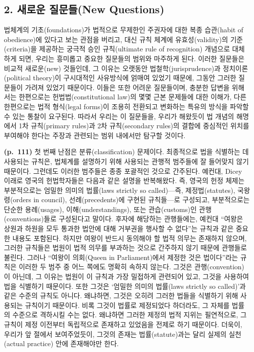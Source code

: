 \subsection{2. 새로운 질문들(New
Questions)}\label{uxc0c8uxb85cuxc6b4-uxc9c8uxbb38uxb4e4new-questions}

법체계의 기초(foundations)가 법적으로 무제한인 주권자에 대한 복종
습관(habit of obedience)에 있다고 보는 관점을 버리고, 대신 규칙 체계에
유효성(validity)의 기준(criteria)을 제공하는 궁극적 승인 규칙(ultimate
rule of recognition) 개념으로 대체하게 되면, 우리는 흥미롭고 중요한
질문들의 범위와 마주하게 된다. 이러한 질문들은 비교적 새로운(new)
것들인데, 그 이유는 오랫동안 법철학(jurisprudence)과 정치이론(political
theory)이 구시대적인 사유방식에 얽매여 있었기 때문에, 그동안 그러한
질문들이 가려져 있었기 때문이다. 이들은 또한 어려운 질문들이며, 충분한
답변을 위해서는 한편으로는 헌법법(constitutional law)의 몇몇 근본
문제들에 대한 이해가, 다른 한편으로는 법적 형식(legal forms)이 조용히
전환되고 변화하는 특유의 방식을 파악할 수 있는 통찰이 요구된다. 따라서
우리는 이 질문들을, 우리가 해왔듯이 법 개념의 해명에서 1차 규칙(primary
rules)과 2차 규칙(secondary rules)의 결합에 중심적인 위치를 부여해야
한다는 주장과 관련되는 범위 내에서만 탐구할 것이다.

\textbf{(p.~111)} 첫 번째 난점은 분류(classification) 문제이다.
최종적으로 법을 식별하는 데 사용되는 규칙은, 법체계를 설명하기 위해
사용되는 관행적 범주들에 잘 들어맞지 않기 때문이다. 그런데도 이러한
범주들은 종종 포괄적인 것으로 간주된다. 예컨대, Dicey 이래로 영국의
헌법학자들은 다음과 같은 설명을 반복해왔다. 즉, 영국의 헌정 체제는
부분적으로는 엄밀한 의미의 법률(laws strictly so called)---즉,
제정법(statutes), 국왕령(orders in council), 선례(precedents)에 구현된
규칙들---로 구성되고, 부분적으로는 단순한 용례(usages),
이해(understandings), 또는 관습(customs)인 관행(conventions)들로
구성된다고 말이다. 후자에 해당하는 관행들에는, 예컨대 ``여왕은 상원과
하원을 모두 통과한 법안에 대해 거부권을 행사할 수 없다''는 규칙과 같은
중요한 내용도 포함된다. 하지만 여왕이 반드시 동의해야 할 법적 의무는
존재하지 않으며, 그러한 규칙들은 법원이 법적 의무를 부과하는 것으로
간주하지 않기 때문에 관행들로 불린다. 그러나 ``여왕이 의회(Queen in
Parliament)에서 제정한 것은 법이다''라는 규칙은 이러한 두 범주 중 어느
쪽에도 명확히 속하지 않는다. 그것은 관행(convention)이 아닌데, 그 이유는
법원이 이 규칙과 가장 밀접하게 관련되어 있고, 그것을 사용하여 법을
식별하기 때문이다. 또한 그것은 `엄밀한 의미의 법률(laws strictly so
called)'과 같은 수준의 규칙도 아니다. 왜냐하면, 그것은 오히려 그러한
법들을 식별하기 위해 사용되는 규칙이기 때문이다. 비록 그것이 법률로
제정되었다 하더라도, 그 자체를 법률의 수준으로 격하시킬 수는 없다.
왜냐하면 그러한 제정의 법적 지위는 필연적으로, 그 규칙이 제정 이전부터
독립적으로 존재하고 있었음을 전제로 하기 때문이다. 더욱이, 우리가 앞
절에서 보여주었듯이, 그것의 존재는 법률(statute)과는 달리 실제의
실천(actual practice) 안에 존재해야만 한다.

